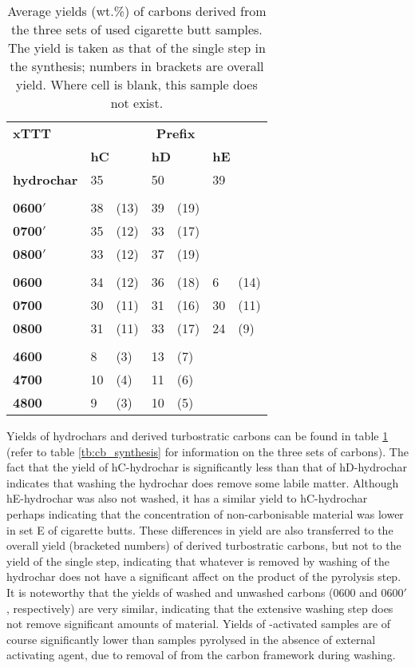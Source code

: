 \begin{table}[ht]
\caption{Average yields (wt.\%) of carbons derived from the three sets of used cigarette butt samples. The yield is taken as that of the single step in the synthesis; numbers in brackets are overall yield. Where cell is blank, this sample does not exist.}
\label{tb:cb_yield}
\begin{tabularx}{\textwidth}{llXlXlX}
\toprule
\textbf{xTTT} & \multicolumn{6}{c}{\textbf{Prefix}} \\
& \multicolumn{2}{l}{\textbf{hC}} & \multicolumn{2}{l}{\textbf{hD}} & \multicolumn{2}{l}{\textbf{hE}} \\ 
\midrule
\textbf{hydrochar}  & 35 & & 50 & & 39 & \\
\\
\textbf{0600$'$} & 38 & (13) & 39 & (19) & & \\
\textbf{0700$'$} & 35 & (12) & 33 & (17) & & \\
\textbf{0800$'$} & 33 & (12) & 37 & (19) & & \\
\\
\textbf{0600} & 34 & (12) & 36 & (18) & 6 & (14) \\
\textbf{0700} & 30 & (11) & 31 & (16) & 30 & (11)\\
\textbf{0800} & 31 & (11) & 33 & (17) & 24 & (9)\\
\\
\textbf{4600} & 8 & (3) & 13 & (7) & & \\
\textbf{4700} & 10 & (4) & 11 & (6) & & \\
\textbf{4800} & 9 & (3) & 10 & (5) & & \\
\bottomrule
\end{tabularx}%
\end{table}

Yields of hydrochars and derived turbostratic carbons can be found in table \ref{tb:cb_yield} (refer to table \ref{tb:cb_synthesis} for information on the three sets of carbons). The fact that the yield of hC-hydrochar is significantly less than that of hD-hydrochar indicates that washing the hydrochar does remove some labile matter. Although hE-hydrochar was also not washed, it has a similar yield to hC-hydrochar perhaps indicating that the concentration of non-carbonisable material was lower in set E of cigarette butts. These differences in yield are also transferred to the overall yield (bracketed numbers) of derived turbostratic carbons, but not to the yield of the single step, indicating that whatever is removed by washing of the hydrochar does not have a significant affect on the product of the pyrolysis step. It is noteworthy that the yields of washed and unwashed carbons (0600 and 0600$'$, respectively) are very similar, indicating that the extensive washing step does not remove significant amounts of material. Yields of -activated samples are of course significantly lower than samples pyrolysed in the absence of external activating agent, due to removal of  from the carbon framework during washing.

